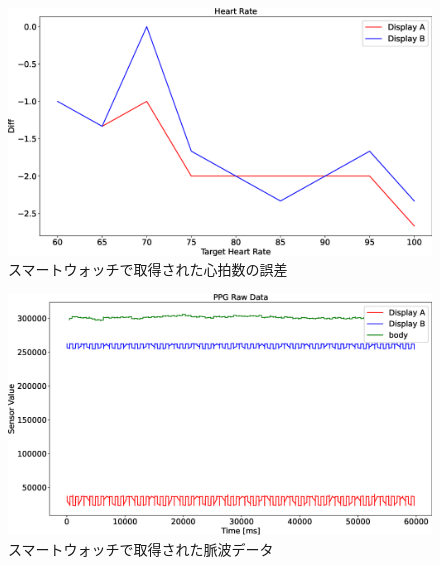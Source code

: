 \documentclass[Japanese,noauthor]{dicomopapers}
\begin{document}
\begin{figure}[!t]
  \begin{center}
    \includegraphics[width=1\linewidth]{figures/heartrate_TicWatch.eps}
  \end{center}
  \caption{スマートウォッチで取得された心拍数の誤差}
  \label{fig:heartrate}
\end{figure}

\begin{figure}[!t]
  \begin{center}
    \includegraphics[width=1\linewidth]{figures/pulse_TicWatch.eps}
  \end{center}
  \caption{スマートウォッチで取得された脈波データ}
  \label{fig:pulse}
\end{figure}
\end{document}
